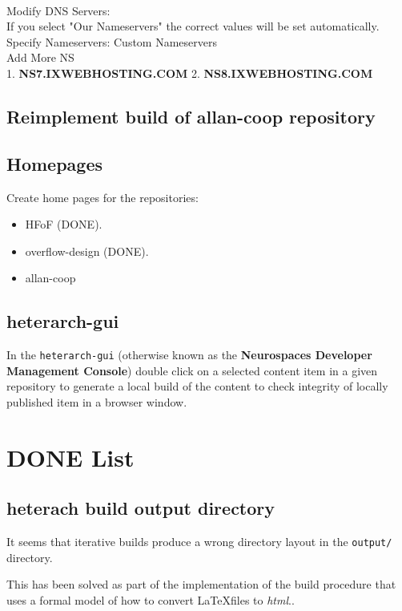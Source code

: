 \documentclass[12pt]{article}
\begin{document}
\\
Modify DNS Servers:\\
If you select "Our Nameservers" the correct values will be set automatically.\\
Specify Nameservers:	Custom Nameservers\\	
Add More NS\\
1.	{\bf NS7.IXWEBHOSTING.COM}	2.	{\bf NS8.IXWEBHOSTING.COM}


\subsection{Reimplement build of allan-coop repository}


\subsection{Homepages}

Create home pages for the repositories:
\begin{itemize}
\item HFoF (DONE).
\item overflow-design (DONE).
\item allan-coop
\end{itemize}


\subsection{heterarch-gui}

In the {\tt heterarch-gui} (otherwise known as the {\bf Neurospaces
  Developer Management Console}) double click on a selected content
item in a given repository to generate a local build of the content to
check integrity of locally published item in a browser window.


\section{DONE List}

\subsection{heterach build output directory}

It seems that iterative builds produce a wrong directory layout in the
{\tt output/} directory.

This has been solved as part of the implementation of the build
procedure that uses a formal model of how to convert \LaTeX files to
{\it html}..
\end{document}
